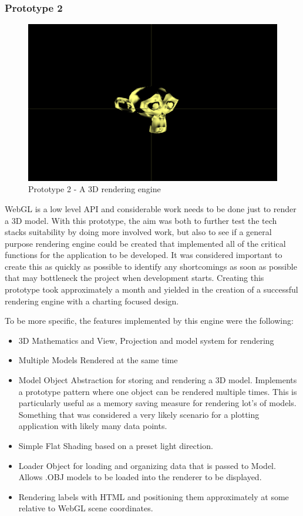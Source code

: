 \subsubsection {Prototype 2}
\begin{figure}[h]
    \centering
    \includegraphics[width=1\columnwidth]{author-files/figures/Monkey-Test2.png}
    \caption{Prototype 2 - A 3D rendering engine}
    \label{fig:Monkey}
\end{figure}

WebGL is a low level API and considerable work needs to be done just to render a 3D model. With this prototype, the aim was both to further test the tech stacks suitability by doing more involved work, but also to see if a general purpose rendering engine could be created that implemented all of the critical functions for the application to be developed. It was considered important to create this as quickly as possible to identify any shortcomings as soon as possible that may bottleneck the project when development starts. Creating this prototype took approximately a month and yielded in the creation of a successful rendering engine with a charting focused design.

To be more specific, the features implemented by this engine were the following:
\begin{itemize}
    \item 3D Mathematics and View, Projection and model system for rendering
    \item Multiple Models Rendered at the same time
    \item Model Object Abstraction for storing and rendering a 3D model. Implements a prototype pattern where one object can be rendered multiple times. This is particularly useful as a memory saving measure for rendering lot's of models. Something that was considered a very likely scenario for a plotting application with likely many data points.
    \item Simple Flat Shading based on a preset light direction.
    \item Loader Object for loading and organizing data that is passed to Model. Allows .OBJ models to be loaded into the renderer to be displayed.
    \item Rendering labels with HTML and positioning them approximately at some relative to WebGL scene coordinates.
\end{itemize}

